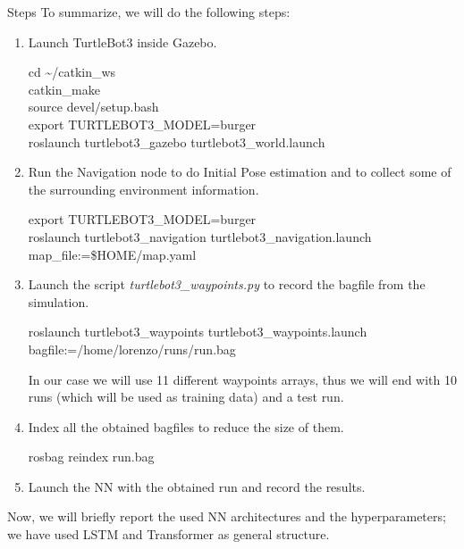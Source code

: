 \documentclass[aspectratio=169,t,xcolor=table]{beamer}
\begin{document}
\begin{frame}[allowframebreaks]{Steps}
    To summarize, we will do the following steps:
    \begin{enumerate}
        \item Launch TurtleBot3 inside Gazebo.
        \begin{block}

            cd \textasciitilde/catkin\_ws\\
            catkin\_make\\
            source devel/setup.bash\\
            export TURTLEBOT3\_MODEL=burger\\
            roslaunch turtlebot3\_gazebo turtlebot3\_world.launch
        \end{block} 
        \item Run the Navigation node to do Initial Pose estimation and to collect some of the surrounding environment information.
        \begin{block}
            
            export TURTLEBOT3\_MODEL=burger\\
            roslaunch turtlebot3\_navigation turtlebot3\_navigation.launch \\ 
            \quad map\_file:=\$HOME/map.yaml
        \end{block} 
        \item Launch the script \textit{turtlebot3\_waypoints.py} to record the bagfile from the simulation.
        \begin{block}
            
            roslaunch turtlebot3\_waypoints turtlebot3\_waypoints.launch\\
            \quad bagfile:=/home/lorenzo/runs/run.bag
        \end{block} 
        In our case we will use 11 different waypoints arrays, thus we will end with 10 runs (which will be used as training data) and a test run.
        \item Index all the obtained bagfiles to reduce the size of them.
        \begin{block}
            
            rosbag reindex run.bag
        \end{block} 
        \item Launch the NN with the obtained run and record the results.
    \end{enumerate}
    Now, we will briefly report the used NN architectures and the hyperparameters; we have used LSTM and Transformer as general structure.
\end{frame}
\end{document}
